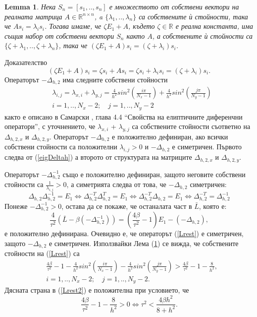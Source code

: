 \documentclass[a4paper]{article}
\newcommand{\be}{\begin{equation}}
\newcommand{\ee}{\end{equation}}
\newcommand{\rf}[1]{(\ref{#1})}
\newcommand{\RR}{\mathbb{R}}
\newtheorem{lm}{Lemma}
\theoremstyle{remark}
\begin{document}
\begin{lm}\label{lemma1}
Нека $S_n=[s_1,..,s_n]$ е множеството от собствени вектори на реалната матрица $A \in \RR^{n\times n}$,
a $\{\lambda_1,..,\lambda_n\}$ са собствените ѝ стойности, така че $A s_i = \lambda_i s_i$. Тогава имаме, че $\zeta E_1 + A$, където $\zeta \in \RR$ е реална константа, има същия набор от собствени вектори $S_n$ както $A$, а собствените ѝ стойности са $\{\zeta + \lambda_1,..,\zeta + \lambda_n\}$, така че $(\zeta E_1 + A)  s_i = (\zeta+ \lambda_i) s_i$.
\end{lm}
Доказателство
\be
(\zeta E_1 + A)  s_i = \zeta s_i + A  s_i = \zeta s_i + \lambda_i s_i = (\zeta + \lambda_i) s_i.
\ee
Операторът $-\Delta_{h,2}$ има следните собствени стойности
\begin{align}\label{eigDeltah}
&\lambda_{i,j} = \lambda_{x, i} + \lambda_{y,j} = \frac{4}{h^2}sin^2(\frac{i \pi}{N_x-1}) +  \frac{4}{h^2}sin^2(\frac{j \pi}{N_y-1}) \\
&i = 1,..,N_x-2; \quad j = 1, .. , N_y-2 \nonumber
\end{align}
както е описано в Самарски \cite{samarski}, глава 4.4 ``Свойства на елиптичните диференчни оператори'', с уточнението, че $\lambda_{x, i}$ + $\lambda_{y,j}$ са собствените стойности съответно на $\Delta_{h,2,x}$ и $\Delta_{h,2,y}$. Операторът $-\Delta_{h,2}$ е положително дефиниран, ако всички собствени стойности са положителни $\lambda_{i,j}>0$ и $-\Delta_{h,2}$ е симетричен. Първото следва от \rf{eigDeltah} а второто от структурата на матриците $\Delta_{h,2,x}$ и $\Delta_{h,2,y}$.

Операторът $-\Delta_{h,2}^{-1}$ също е положително дефиниран, защото неговите собствени стойности са $\frac{1}{\lambda_{i,j}} > 0$, а симетрията следва от това, че $-\Delta_{h,2}$ симетричен:
\begin{equation*}
\Delta_{h,2}  \Delta_{h,2}^{-1} = E_1 \Leftrightarrow \Delta_{h,2}^{-T}  \Delta_{h,2}^{T} = E_1 \Leftrightarrow \Delta_{h,2}^{-T}  \Delta_{h,2} = E_1 
\Leftrightarrow \Delta_{h,2}^{-T} = \Delta_{h,2}^{-1} 
\end{equation*}
Понеже $-\Delta_{h,2}^{-1} > 0$, остава да се покаже, че останалата част в $\bar L$, която е:
\be\label{Lrest}
\frac{4}{\tau^2}\left( \bar L - \beta ( - \Delta_{h,2}^{-1}) \right) = \left( \frac{4 \beta}{\tau^2} - 1\right) E_1 -(-\Delta_{h,2}),
\ee
е положително дефинирана. Очевидно е, че операторът \rf{Lrest} е симетричен, защото $-\Delta_{h,2}$ е симетричен. Използвайки Лема \rf{lemma1} се вижда, че собствените стойности на \rf{Lrest} са
\begin{align}\label{Lrest2}
 &\frac{4 \beta}{\tau^2} - 1 - \frac{4}{h^2}sin^2(\frac{i \pi}{N_x-1}) - \frac{4}{h^2}sin^2(\frac{j \pi}{N_y-1}) > \frac{4 \beta}{\tau^2} - 1 - \frac{8}{h^2}, \\
&i = 1,..,N_x-2; \quad j = 1, .. , N_y-2. \nonumber
\end{align}
Дясната страна в \rf{Lrest2} е положителна при условието, че
\be\label{stabCond}
\frac{4 \beta}{\tau^2} - 1 - \frac{8}{h^2} > 0  \Leftrightarrow \tau^2 < \frac{4 \beta h^2}{8 + h^2}.
\ee
\end{document}

